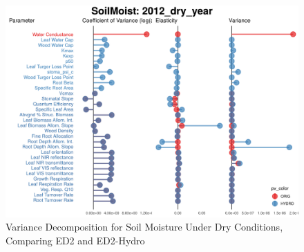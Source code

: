 \begin{figure}[!h]
    \centering
    \includegraphics[width=.8\textwidth]{Hydro_Paper_LaTeX/Hydro_Paper_Figures/VDC_SoilMoist_dry.png}
    \caption[Soil Moisture Variance Decomposition]{Variance Decomposition for Soil Moisture Under Dry Conditions, Comparing ED2 and ED2-Hydro}
    \label{fig:constraint_var}
\end{figure}
